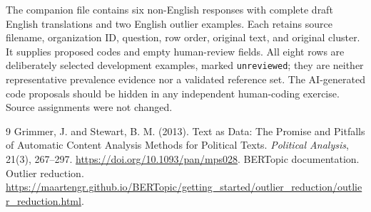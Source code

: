 \documentclass[11pt,a4paper]{article}
\begin{document}
The companion file
contains six non-English responses with complete draft English translations
and two English outlier examples. Each retains source filename, organization
ID, question, row order, original text, and original cluster.
It supplies proposed codes and empty human-review fields. All eight rows
are deliberately selected development examples, marked \texttt{unreviewed};
they are neither representative prevalence evidence nor a validated
reference set. The AI-generated code proposals should be hidden in any
independent human-coding exercise. Source assignments were not changed.

\begin{thebibliography}{9}
Grimmer, J. and Stewart, B. M. (2013).
Text as Data: The Promise and Pitfalls of Automatic Content Analysis Methods
for Political Texts. \emph{Political Analysis}, 21(3), 267--297.
\url{https://doi.org/10.1093/pan/mps028}.
BERTopic documentation. Outlier reduction.
\url{https://maartengr.github.io/BERTopic/getting_started/outlier_reduction/outlier_reduction.html}.
\end{thebibliography}
\end{document}
